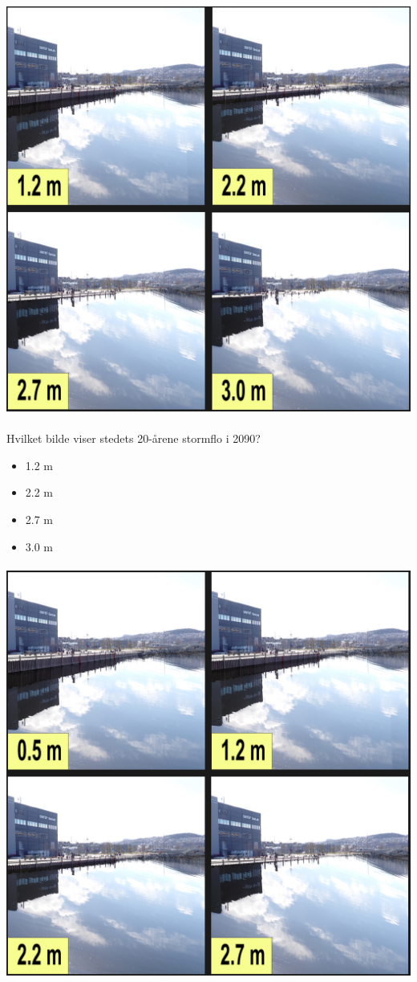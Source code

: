 \includegraphics[width=1\textwidth]{fig_appendix/brattora 2090 q.png}
\paragraph{}
Hvilket bilde viser stedets 20-årene stormflo i 2090?
\begin{itemize}
    \item 1.2 m
    \item 2.2 m
    \item 2.7 m
    \item 3.0 m
\end{itemize}
\paragraph{}

\includegraphics[width=1\textwidth]{fig_appendix/brattora 2022 q.png}
